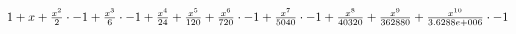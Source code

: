 \documentclass[32pt]{article}
\begin{document}
             
${{{{{{{{{{{1} + {x}} + {{{{x} ^ {2}} \over {2}} \cdot {-1}}} + {{{{x} ^ {3}} \over {6}} \cdot {-1}}} + {{{x} ^ {4}} \over {24}}} + {{{x} ^ {5}} \over {120}}} + {{{{x} ^ {6}} \over {720}} \cdot {-1}}} + {{{{x} ^ {7}} \over {5040}} \cdot {-1}}} + {{{x} ^ {8}} \over {40320}}} + {{{x} ^ {9}} \over {362880}}} + {{{{x} ^ {10}} \over {3.6288e+006}} \cdot {-1}}}$
\end{document}
